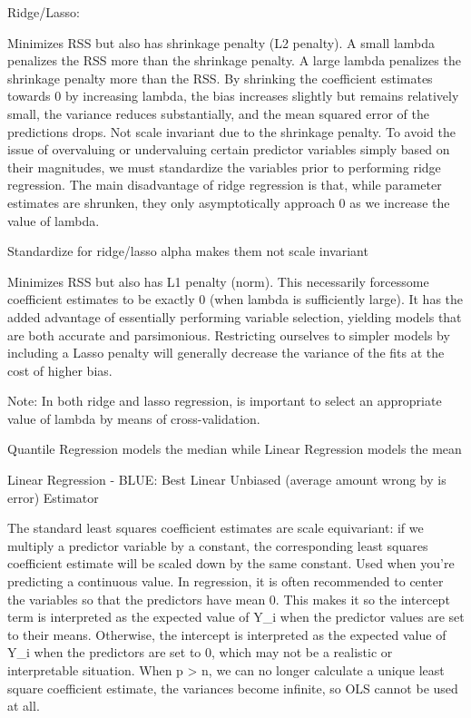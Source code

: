 \documentclass[]{book}
\begin{document}
Ridge/Lasso:

Minimizes RSS but also has shrinkage penalty (L2 penalty). A small
lambda penalizes the RSS more than the shrinkage penalty. A large lambda
penalizes the shrinkage penalty more than the RSS. By shrinking the
coefficient estimates towards 0 by increasing lambda, the bias increases
slightly but remains relatively small, the variance reduces
substantially, and the mean squared error of the predictions drops. Not
scale invariant due to the shrinkage penalty. To avoid the issue of
overvaluing or undervaluing certain predictor variables simply based on
their magnitudes, we must standardize the variables prior to performing
ridge regression. The main disadvantage of ridge regression is that,
while parameter estimates are shrunken, they only asymptotically
approach 0 as we increase the value of lambda.

Standardize for ridge/lasso alpha makes them not scale invariant

Minimizes RSS but also has L1 penalty (norm). This necessarily
forcessome coefficient estimates to be exactly 0 (when lambda is
sufficiently large). It has the added advantage of essentially
performing variable selection, yielding models that are both accurate
and parsimonious. Restricting ourselves to simpler models by including a
Lasso penalty will generally decrease the variance of the fits at the
cost of higher bias.

Note: In both ridge and lasso regression, is important to select an
appropriate value of lambda by means of cross-validation.

Quantile Regression models the median while Linear Regression models the
mean

Linear Regression - BLUE: Best Linear Unbiased (average amount wrong by
is error) Estimator

The standard least squares coefficient estimates are scale equivariant:
if we multiply a predictor variable by a constant, the corresponding
least squares coefficient estimate will be scaled down by the same
constant. Used when you're predicting a continuous value. In regression,
it is often recommended to center the variables so that the predictors
have mean 0. This makes it so the intercept term is interpreted as the
expected value of Y\_i when the predictor values are set to their means.
Otherwise, the intercept is interpreted as the expected value of Y\_i
when the predictors are set to 0, which may not be a realistic or
interpretable situation. When p \textgreater{} n, we can no longer
calculate a unique least square coefficient estimate, the variances
become infinite, so OLS cannot be used at all.
\end{document}

